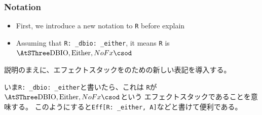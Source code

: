 \begin{frame}
  \frametitle{Notation}

  \begin{itemize}
    \item First, we introduce a new notation to \lstinline|R|
    before explain
    
    \item Assuming that \lstinline|R: _dbio: _either|, it means
    \lstinline|R| is $\SThree{\lstinline|DBIO|,\lstinline|Either|,NoFx}$
  \end{itemize}

  \begin{notes}
    \item 説明のまえに、エフェクトスタックをのための新しい表記を導入する。

    \item いま\lstinline|R: _dbio: _either|と書いたら、これは
    \lstinline|R|が$\SThree{\lstinline|DBIO|,\lstinline|Either|,NoFx}$という
    エフェクトスタックであることを意味する。
    このようにすると\lstinline|Eff[R: _either, A]|などと書けて便利である。
  \end{notes}
\end{frame}

